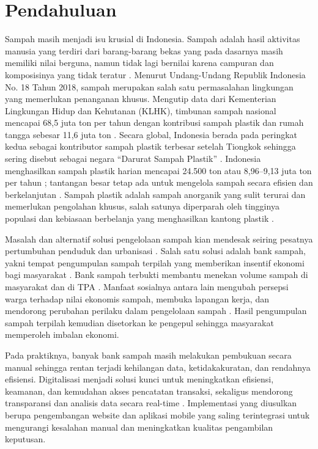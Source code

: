 \documentclass[conference, compsoc, twoside]{IEEEtran}
\begin{document}
\fi

\iffalse
\section{Pendahuluan}
Sampah masih menjadi isu krusial di Indonesia. Sampah adalah hasil aktivitas manusia yang terdiri dari barang-barang bekas yang pada dasarnya masih memiliki nilai berguna, namun tidak lagi bernilai karena campuran dan komposisinya yang tidak teratur \cite{Mahyudin2014}. Menurut Undang-Undang Republik Indonesia No. 18 Tahun 2018, sampah merupakan salah satu permasalahan lingkungan yang memerlukan penanganan khusus. Mengutip data dari Kementerian Lingkungan Hidup dan Kehutanan (KLHK), timbunan sampah nasional mencapai 68{,}5 juta ton per tahun dengan kontribusi sampah plastik dan rumah tangga sebesar 11{,}6 juta ton \cite{KLHK2022}. Secara global, Indonesia berada pada peringkat kedua sebagai kontributor sampah plastik terbesar setelah Tiongkok sehingga sering disebut sebagai negara “Darurat Sampah Plastik” \cite{Putu2020}. Indonesia menghasilkan sampah plastik harian mencapai 24.500 ton atau 8{,}96–9{,}13 juta ton per tahun \cite{AlamsyahFadli2023}; tantangan besar tetap ada untuk mengelola sampah secara efisien dan berkelanjutan \cite{KLHK2020}. Sampah plastik adalah sampah anorganik yang sulit terurai dan memerlukan pengolahan khusus, salah satunya diperparah oleh tingginya populasi dan kebiasaan berbelanja yang menghasilkan kantong plastik \cite{Kuswardhani2016}.

Masalah dan alternatif solusi pengelolaan sampah kian mendesak seiring pesatnya pertumbuhan penduduk dan urbanisasi \cite{Lingga2024}. Salah satu solusi adalah bank sampah, yakni tempat pengumpulan sampah terpilah yang memberikan insentif ekonomi bagi masyarakat \cite{Ariefahnoor2020}. Bank sampah terbukti membantu menekan volume sampah di masyarakat dan di TPA \cite{Suryani2014}. Manfaat sosialnya antara lain mengubah persepsi warga terhadap nilai ekonomis sampah, membuka lapangan kerja, dan mendorong perubahan perilaku dalam pengelolaan sampah \cite{Ramadani2021}. Hasil pengumpulan sampah terpilah kemudian disetorkan ke pengepul sehingga masyarakat memperoleh imbalan ekonomi.

Pada praktiknya, banyak bank sampah masih melakukan pembukuan secara manual sehingga rentan terjadi kehilangan data, ketidakakuratan, dan rendahnya efisiensi. Digitalisasi menjadi solusi kunci untuk meningkatkan efisiensi, keamanan, dan kemudahan akses pencatatan transaksi, sekaligus mendorong transparansi dan analisis data secara real-time \cite{Radiansyah2022}. Implementasi yang diusulkan berupa pengembangan website dan aplikasi mobile yang saling terintegrasi untuk mengurangi kesalahan manual dan meningkatkan kualitas pengambilan keputusan.
\end{document}

